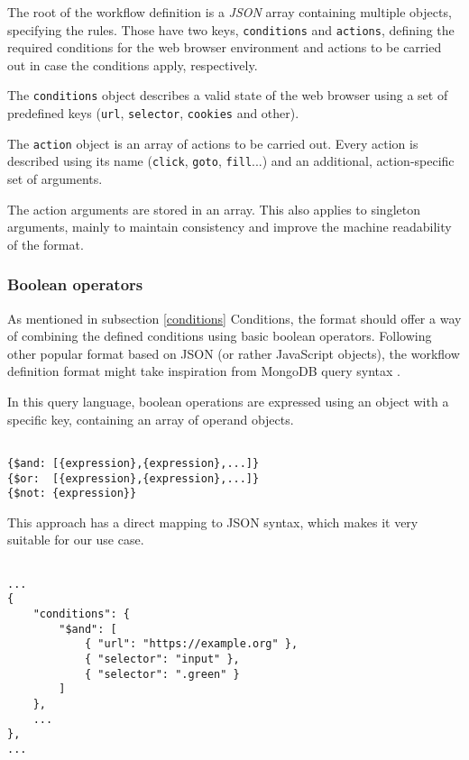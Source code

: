 The root of the workflow definition is a \textit{JSON} array containing multiple objects, specifying the rules. 
Those have two keys, \texttt{conditions} and \texttt{actions}, defining the required conditions for the web browser environment and actions to be carried out in case the conditions apply, respectively.

The \texttt{conditions} object describes a valid state of the web browser using a set of predefined keys (\texttt{url}, \texttt{selector}, \texttt{cookies} and other).

The \texttt{action} object is an array of actions to be carried out. 
Every action is described using its name (\texttt{click}, \texttt{goto}, \texttt{fill}...) and an additional, action-specific set of arguments.

The action arguments are stored in an array. 
This also applies to singleton arguments, mainly to maintain consistency and improve the machine readability of the format.


\subsubsection{Boolean operators}
As mentioned in subsection \ref{conditions} Conditions, the format should offer a way of combining the defined conditions using basic boolean operators.
Following other popular format based on JSON (or rather JavaScript objects), the workflow definition format might take inspiration from MongoDB query syntax .

In this query language, boolean operations are expressed using an object with a specific key, containing an array of operand objects.

\begin{minipage}{0.95\linewidth}
    \begin{verbatim}

{$and: [{expression},{expression},...]}
{$or:  [{expression},{expression},...]}
{$not: {expression}}

    \end{verbatim}
\end{minipage}

This approach has a direct mapping to JSON syntax, which makes it very suitable for our use case.

\begin{minipage}{0.95\linewidth}
\begin{verbatim}

...
{
    "conditions": {
        "$and": [
            { "url": "https://example.org" },
            { "selector": "input" },
            { "selector": ".green" }
        ]
    },
    ...
},
...

\end{verbatim}
\end{minipage}

